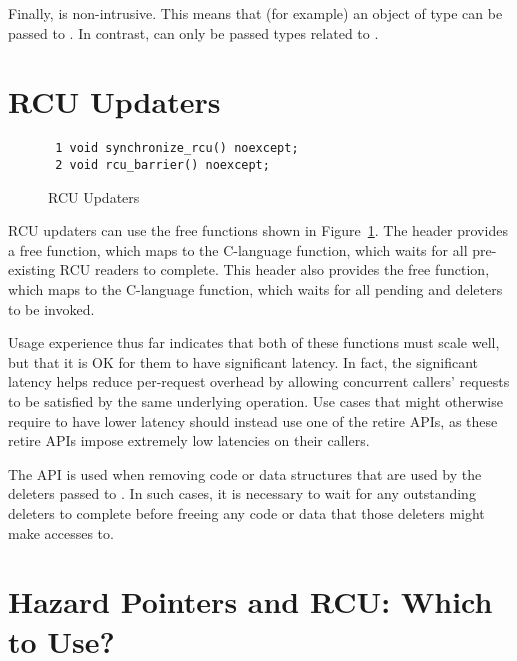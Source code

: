 \documentclass[letterpaper,10pt]{article}
\begin{document}
Finally,  is non-intrusive.
This means that (for example) an object of type  can be
passed to .
In contrast,  can only be passed types
related to .

\section{RCU Updaters}
\label{sec:RCU Updaters}

\begin{figure}[tbp]
{ \scriptsize
\begin{verbatim}
 1 void synchronize_rcu() noexcept;
 2 void rcu_barrier() noexcept;
\end{verbatim}
}
\caption{RCU Updaters}
\label{fig:RCU Updaters}
\end{figure}

RCU updaters can use the free functions shown in
Figure~\ref{fig:RCU Updaters}.
The  header provides a  free function,
which maps to the C-language  function, which
waits for all pre-existing RCU readers to complete.
This header also provides the  free function,
which maps to the C-language  function,
which waits for all pending  and 
deleters to be invoked.

Usage experience thus far indicates that both of these functions must
scale well, but that it is OK for them to have significant latency.
In fact, the significant latency helps reduce per-request overhead
by allowing concurrent callers' requests to be satisfied by the same
underlying operation.
Use cases that might otherwise require  to
have lower latency should instead use one of the retire APIs, as
these retire APIs impose extremely low latencies on their callers.

The  API is used when removing code or data structures
that are used by the deleters passed to .
In such cases, it is necessary to wait for any outstanding deleters to
complete before freeing any code or data that those deleters might
make accesses to.

\section{Hazard Pointers and RCU: Which to Use?}
\label{sec:Hazard Pointers and RCU: Which to Use?}
\end{document}
